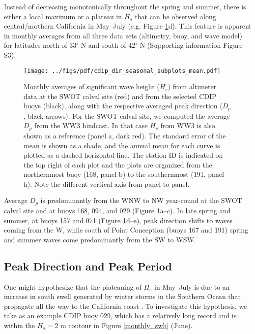 Instead of decreasing monotonically throughout the spring and summer, there is either a local maximum or a plateau in $H_s$ that can be observed along central/northern California in May--July (e.g. Figure \ref{seasonal}d). This feature is apparent in monthly averages from all three data sets (altimetry, buoy, and wave model) for latitudes north of 33$^\circ$ N and south of 42$^\circ$ N (Supporting information Figure S3). 
\begin{figure}[h]
\centering
\texttt{[image: ../figs/pdf/cdip\_dir\_seasonal\_subplots\_mean.pdf]}
\caption{Monthly averages of significant wave height ($H_s$) from altimeter data at the SWOT calval site (red) and from the selected CDIP buoys (black), along with the respective averaged peak direction ($D_p$, black arrows). For the SWOT calval site, we computed the average $D_p$ from the WW3 hindcast. In that case $H_s$ from WW3 is also shown as a reference (panel a, dark red).  
The standard error of the mean is shown as a shade, and the annual mean for each curve is plotted as a dashed horizontal line. The station ID is indicated on the top right of each plot and the plots are organized from the northernmost buoy (168, panel b) to the southernmost (191, panel h). Note the different vertical axis from panel to panel.}
\label{seasonal}
\end{figure}
Average $D_p$ is predominantly from the WNW to NW year-round at the SWOT calval site and at buoys 168, 094, and 029 (Figure \ref{seasonal}a--c). In late spring and summer, at buoys 157 and 071 (Figure \ref{seasonal}d--e), peak direction shifts to waves coming from the W, while south of Point Conception (buoys 167 and 191) spring and summer waves come predominantly from the SW to WSW. 

\subsection{Peak Direction and Peak Period}\label{dirvar}
One might hypothesize that the plateauing of $H_s$ in May--July is due to an increase in south swell generated by winter storms in the Southern Ocean that propagate all the way to the California coast \citep{snodgrass1966propagation}.
To investigate this hypothesis, we take as an example CDIP buoy 029, which has a relatively long record and is within the $ H_s = 2$ m contour in Figure \ref{monthly_swh} (June).

